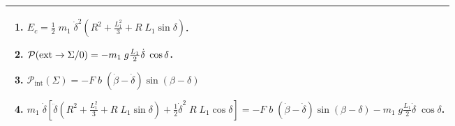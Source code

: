 \begin{multicols}{2}
\ifprof
\else
\ifcolle
\else
\noindent
\begin{tabular}{|p{\linewidth}|}
\hline
\begin{enumerate}
\item  $E_c=\frac{1}{2}\;m_1\;\dot{\delta}^2\left(R^2+\frac{L_1^2}{3}+R\;L_1\sin\delta\right)$.
\item  $ \mathcal{P}(\text{\text{ext}}\rightarrow \Sigma/0)= -m_1\;g\frac{L_1}{2}\dot{\delta}\;\cos\delta $.
\item  $ \mathcal{P}_{\text{int}}\left( \Sigma\right)=-F\;b\;\left(\dot{\beta}-\dot{\delta}\right)\sin(\beta-\delta) $
\item $m_1\;\dot{\delta}\left[\ddot{\delta}\left(R^2+\frac{L_1^2}{3}+R\;L_1\sin\delta\right)+\frac{1}{2}\dot{\delta}^2\;R\;L_1\cos\delta\right]
=-F\;b\;\left(\dot{\beta}-\dot{\delta}\right)\sin(\beta-\delta)-m_1\;g\frac{L_1}{2}\dot{\delta}\;\cos\delta $.
\end{enumerate} \\
\hline
\end{tabular}
\fi

\fi



\ifprof
\else
\end{multicols}%
\fi

